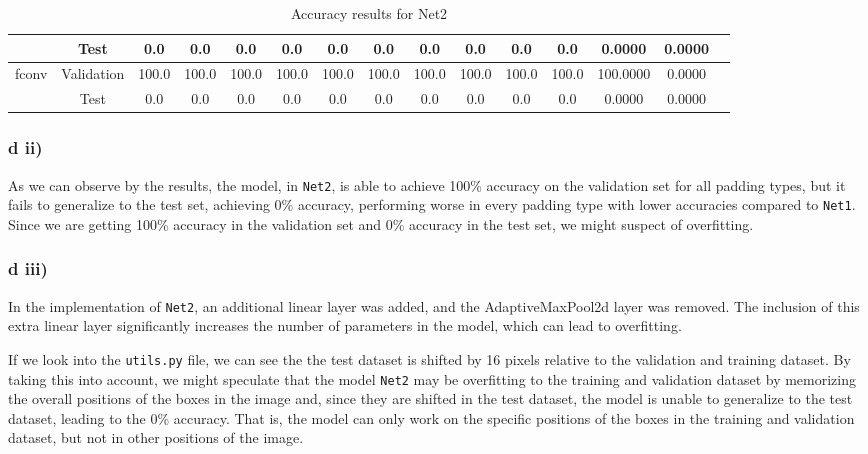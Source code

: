 \documentclass{article}
\begin{document}
\begin{table}[h!]
{\begin{tabular}{|c|c|c|c|c|c|c|c|c|c|c|c|c|c|c|}
                               & Test       & 0.0   & 0.0   & 0.0   & 0.0   & 0.0   & 0.0   & 0.0   & 0.0   & 0.0   & 0.0   & 0.0000   & 0.0000 \\ \hline
    \multirow{2}{*}{fconv}     & Validation & 100.0 & 100.0 & 100.0 & 100.0 & 100.0 & 100.0 & 100.0 & 100.0 & 100.0 & 100.0 & 100.0000 & 0.0000 \\ \cline{2-14}
                               & Test       & 0.0   & 0.0   & 0.0   & 0.0   & 0.0   & 0.0   & 0.0   & 0.0   & 0.0   & 0.0   & 0.0000   & 0.0000 \\ \hline
    \end{tabular}
    }
    \caption{Accuracy results for Net2}
    \label{tab:results_accuracy_net2}
\end{table}

\subsubsection*{d ii)}

As we can observe by the results, the model, in \texttt{Net2}, is able to achieve 100\% accuracy on the validation set for all padding types, 
but it fails to generalize to the test set, achieving 0\% accuracy, performing worse in every padding type
with lower accuracies compared to \texttt{Net1}. Since we are getting 100\% accuracy in the validation set and 0\% accuracy in the test set,
we might suspect of overfitting. 

\subsubsection*{d iii)}

In the implementation of \texttt{Net2}, an additional linear layer was added, and the AdaptiveMaxPool2d layer was removed.
The inclusion of this extra linear layer significantly increases the number of parameters in the model, which can lead to overfitting.

If we look into the \texttt{utils.py} file, we can see the the test dataset is shifted by 16 pixels relative to the validation
and training dataset. By taking this into account, we might speculate that the model \texttt{Net2} may be overfitting to the training and validation dataset
by memorizing the overall positions of the boxes in the image and, since they are shifted in the test dataset, the model is unable to
generalize to the test dataset, leading to the 0\% accuracy. That is, the model can only work on the specific positions of the boxes
in the training and validation dataset, but not in other positions of the image.
\end{document}
